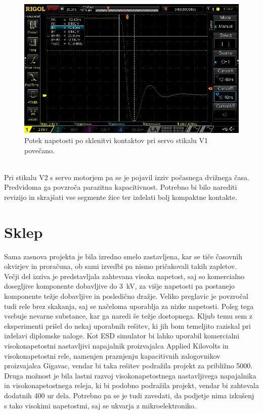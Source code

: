 \documentclass[a4paper,twoside,openright,12pt,Slovene]{book}
\begin{document}
    \begin{figure}[H]
        \centering
        \includegraphics[width=1\columnwidth]{Slike/ServoStikalo1/ServoStikalo1povecano.png}
        \caption{\label{ServoStikalo1povecano} Potek napetosti po sklenitvi kontaktov pri servo stikalu V1 povečano.}
    \end{figure}
    
    ~\\Pri stikalu V2 s servo motorjem pa se je pojavil izziv počasnega dvižnega časa. Predvidoma ga povzroča parazitna kapacitivnost. Potrebno bi bilo narediti revizijo in skrajšati vse segmente žice ter izdelati bolj kompaktne kontakte.
    





\chapter{Sklep} \label{Sklep}

Sama zasnova projekta je bila izredno smelo zastavljena, kar se tiče časovnih okvirjev in proračuna, ob sami izvedbi pa nismo pričakovali takih zapletov.
~\\Večji del izziva je predstavljala zahtevana visoka napetost, saj so komercialno
dosegljive komponente dobavljive do \SI{3}{\kilo\volt}, za višje napetosti pa postanejo komponente težje dobavljive in posledično dražje. Veliko preglavic je povzročal tudi rele brez skakanja, saj se načeloma uporablja za nizke napetosti. Poleg tega vsebuje nevarne substance, kar ga naredi še težje dostopnega. Kljub temu sem z eksperimenti prišel do nekaj uporabnih rešitev, ki jih bom temeljito raziskal pri izdelavi diplomske naloge. Kot ESD simulator bi lahko uporabil komercialni visokonapetostni nastavljivi napajalnik proizvajalca Applied Kilovolts in visokonapetostni rele, namenjen praznjenju kapacitivnih zalogovnikov
proizvajalca Gigavac, vendar bi taka rešitev podražila projekt za približno 5000\texteuro . Druga možnost je bila lastni razvoj visokonapetostnega nastavljivega
napajalnika in visokonapetostnega releja, ki bi podobno podražila projekt, vendar bi zahtevala dodatnih 400 ur dela. Potrebno pa se je tudi zavedati, da podjetje nima izkušenj s tako visokimi napetostmi, saj se ukvarja z mikroelektroniko.


	
 
\end{document}
